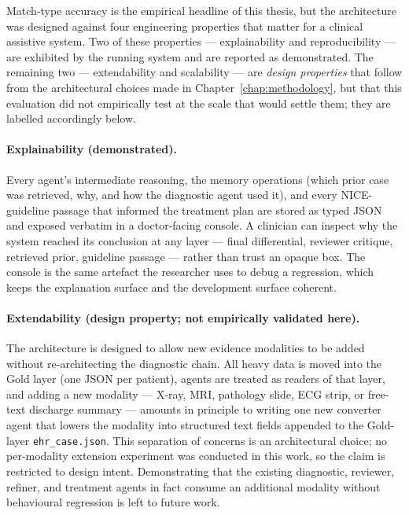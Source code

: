 Match-type accuracy is the empirical headline of this thesis, but the
architecture was designed against four engineering properties that
matter for a clinical assistive system. Two of these
properties --- explainability and reproducibility --- are exhibited by
the running system and are reported as demonstrated. The remaining
two --- extendability and scalability --- are \emph{design
properties} that follow from the architectural choices made in
Chapter~\ref{chap:methodology}, but that this evaluation did not
empirically test at the scale that would settle them; they are
labelled accordingly below.

\paragraph{Explainability (demonstrated).}
Every agent's intermediate reasoning, the memory operations (which
prior case was retrieved, why, and how the diagnostic agent used it),
and every NICE-guideline passage that informed the treatment plan are
stored as typed JSON and exposed verbatim in a doctor-facing console.
A clinician can inspect why the system reached its conclusion at any
layer --- final differential, reviewer critique, retrieved prior,
guideline passage --- rather than trust an opaque box. The console is
the same artefact the researcher uses to debug a regression, which
keeps the explanation surface and the development surface coherent.

\paragraph{Extendability (design property; not empirically validated here).}
The architecture is designed to allow new evidence modalities to be
added without re-architecting the diagnostic chain. All heavy data
is moved into the Gold layer (one JSON per patient), agents are
treated as readers of that layer, and adding a new modality ---
X-ray, MRI, pathology slide, ECG strip, or free-text discharge
summary --- amounts in principle to writing one new converter agent
that lowers the modality into structured text fields appended to the
Gold-layer \texttt{ehr\_case.json}. This separation of concerns is
an architectural choice; no per-modality extension experiment was
conducted in this work, so the claim is restricted to design intent.
Demonstrating that the existing diagnostic, reviewer, refiner, and
treatment agents in fact consume an additional modality without
behavioural regression is left to future work.

